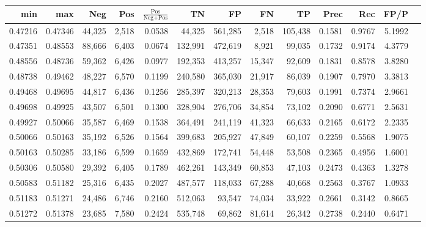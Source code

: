 \begin{tabular}{rrrrrrrrrrrrr}
\toprule
    min &     max &    Neg &   Pos & $\frac{\text{Pos}}{\text{Neg}+\text{Pos}}$ &      TN &      FP &      FN &      TP &   Prec &    Rec &   FP/P \\
\midrule
0.47216 & 0.47346 & 44,325 & 2,518 &                                     0.0538 &  44,325 & 561,285 &   2,518 & 105,438 & 0.1581 & 0.9767 & 5.1992 \\
0.47351 & 0.48553 & 88,666 & 6,403 &                                     0.0674 & 132,991 & 472,619 &   8,921 &  99,035 & 0.1732 & 0.9174 & 4.3779 \\
0.48556 & 0.48736 & 59,362 & 6,426 &                                     0.0977 & 192,353 & 413,257 &  15,347 &  92,609 & 0.1831 & 0.8578 & 3.8280 \\
0.48738 & 0.49462 & 48,227 & 6,570 &                                     0.1199 & 240,580 & 365,030 &  21,917 &  86,039 & 0.1907 & 0.7970 & 3.3813 \\
0.49468 & 0.49695 & 44,817 & 6,436 &                                     0.1256 & 285,397 & 320,213 &  28,353 &  79,603 & 0.1991 & 0.7374 & 2.9661 \\
0.49698 & 0.49925 & 43,507 & 6,501 &                                     0.1300 & 328,904 & 276,706 &  34,854 &  73,102 & 0.2090 & 0.6771 & 2.5631 \\
0.49927 & 0.50066 & 35,587 & 6,469 &                                     0.1538 & 364,491 & 241,119 &  41,323 &  66,633 & 0.2165 & 0.6172 & 2.2335 \\
0.50066 & 0.50163 & 35,192 & 6,526 &                                     0.1564 & 399,683 & 205,927 &  47,849 &  60,107 & 0.2259 & 0.5568 & 1.9075 \\
0.50163 & 0.50285 & 33,186 & 6,599 &                                     0.1659 & 432,869 & 172,741 &  54,448 &  53,508 & 0.2365 & 0.4956 & 1.6001 \\
0.50306 & 0.50580 & 29,392 & 6,405 &                                     0.1789 & 462,261 & 143,349 &  60,853 &  47,103 & 0.2473 & 0.4363 & 1.3278 \\
0.50583 & 0.51182 & 25,316 & 6,435 &                                     0.2027 & 487,577 & 118,033 &  67,288 &  40,668 & 0.2563 & 0.3767 & 1.0933 \\
0.51183 & 0.51271 & 24,486 & 6,746 &                                     0.2160 & 512,063 &  93,547 &  74,034 &  33,922 & 0.2661 & 0.3142 & 0.8665 \\
0.51272 & 0.51378 & 23,685 & 7,580 &                                     0.2424 & 535,748 &  69,862 &  81,614 &  26,342 & 0.2738 & 0.2440 & 0.6471 \\

\end{tabular}
